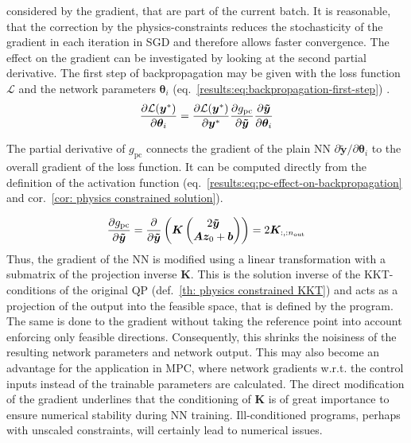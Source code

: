 considered by the gradient, that are part of the current batch. It is reasonable, that
the correction by the physics-constraints reduces the stochasticity of the gradient
in each iteration in SGD and therefore allows faster convergence. 
The effect on the gradient can be investigated by looking at the second partial derivative.
The first step of backpropagation may be given with
the loss function $\mathcal{L}$ and the network parameters $\bm{\theta}_i$ 
(eq.~\ref{results:eq:backpropagation-first-step}) \cite{deisenroth2019}.
\begin{equation}
    \label{results:eq:backpropagation-first-step}
    \frac{\partial \mathcal{L}({\bm{y}}^*)}{\partial \bm{\theta}_i} = 
    \frac{\partial \mathcal{L}({\bm{y}}^*)}{\partial {\bm{y}}^*} 
    \frac{\partial g_\text{pc}}{\partial \bm{\tilde{y}}}
    \frac{\partial \bm{\tilde{y}}}{\partial \bm{\theta}_i} 
\end{equation}

\noindent
The partial derivative of $g_\text{pc}$ connects the gradient of the plain NN
$\partial \bm{\tilde{y}} / \partial \bm{\theta}_i$ 
to the overall gradient of the loss function. It can be computed directly
from the definition of the activation function (eq.~\ref{results:eq:pc-effect-on-backpropagation}
and cor.~\ref{cor: physics constrained solution}).

\begin{equation}
    \label{results:eq:pc-effect-on-backpropagation}
    \frac{\partial g_\text{pc}}{\partial \bm{\tilde{y}}} =
    \frac{\partial}{\partial \bm{\tilde{y}}} \begin{pmatrix} \bm{K}
        \begin{pmatrix}
            2 \bm{\tilde{y}} \\
            \bm{A} {\bm{z}}_0 + {\bm{b}}
        \end{pmatrix}
    \end{pmatrix} =
    2 \bm{K}_{:,:n_\text{out}}
\end{equation}
\noindent
Thus, the gradient of the NN is modified using a linear transformation with a submatrix of
the projection inverse $\bm{K}$. This is the solution inverse of the KKT-conditions of the original
QP (def.~\ref{th: physics constrained KKT}) and acts as a projection of the output into the feasible space,
that is defined by the program.
The same is done to the gradient without taking the reference point
into account enforcing only feasible directions.
Consequently, this shrinks 
the noisiness of the resulting network parameters and network output. This may also become
an advantage for the application in MPC, where network gradients w.r.t. the 
control inputs instead of the trainable parameters are calculated.
The direct modification of the gradient underlines that the conditioning of $\bm{K}$
is of great importance to ensure numerical stability during NN training.
Ill-conditioned programs, perhaps with unscaled constraints, will certainly lead to numerical issues.


